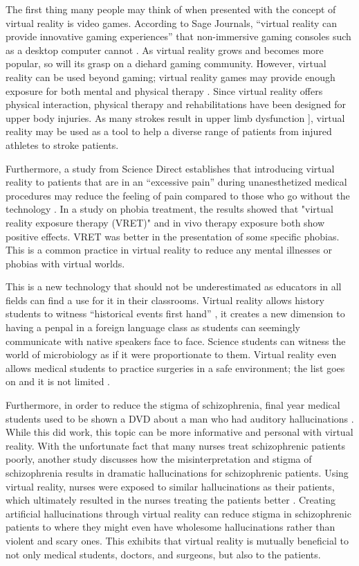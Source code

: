 \documentclass[manuscript,screen,review]{acmart}
\begin{document}
The first thing many people may think of when presented with the concept of virtual reality is video games. According to Sage Journals, “virtual reality can provide innovative gaming experiences” that non-immersive gaming consoles such as a desktop computer cannot \cite{PALLAVICINI}. As virtual reality grows and becomes more popular, so will its grasp on a diehard gaming community. However, virtual reality can be used beyond gaming; virtual reality games may provide enough exposure for both mental and physical therapy \cite{SMYS}. Since virtual reality offers physical interaction, physical therapy and rehabilitations have been designed for upper body injuries. As many strokes result in upper limb dysfunction \cite{YATES}], virtual reality may be used as a tool to help a diverse range of patients from injured athletes to stroke patients. 

Furthermore, a study from Science Direct establishes that introducing virtual reality to patients that are in an “excessive pain” during unanesthetized medical procedures may reduce the feeling of pain compared to those who go without the technology \cite{HOFFMAN}. In a study on phobia treatment, the results showed that "virtual reality exposure therapy (VRET)" and in vivo therapy exposure both show positive effects. VRET was better in the presentation of some specific phobias\cite{FREITAS}. This is a common practice in virtual reality to reduce any mental illnesses or phobias with virtual worlds.

This is a new technology that should not be underestimated as educators in all fields can find a use for it in their classrooms. Virtual reality allows history students to witness “historical events first hand” \cite{BOYLES}, it creates a new dimension to having a penpal in a foreign language class as students can seemingly communicate with native speakers face to face. Science students can witness the world of microbiology as if it were proportionate to them. Virtual reality even allows medical students to practice surgeries in a safe environment; the list goes on and it is not limited \cite{BOYLES}. 

Furthermore, in order to reduce the stigma of schizophrenia, final year medical students used to be shown a DVD about a man who had auditory hallucinations \cite{GALLETLY}. While this did work, this topic can be more informative and personal with virtual reality. With the unfortunate fact that many nurses treat schizophrenic patients poorly, another study discusses how the misinterpretation and stigma of schizophrenia results in dramatic hallucinations for schizophrenic patients. Using virtual reality, nurses were exposed to similar hallucinations as their patients, which ultimately resulted in the nurses treating the patients better \cite{FREEMAN}. Creating artificial hallucinations through virtual reality can reduce stigma in schizophrenic patients to where they might even have wholesome hallucinations rather than violent and scary ones. This exhibits that virtual reality is mutually beneficial to not only medical students, doctors, and surgeons, but also to the patients.
\end{document}
